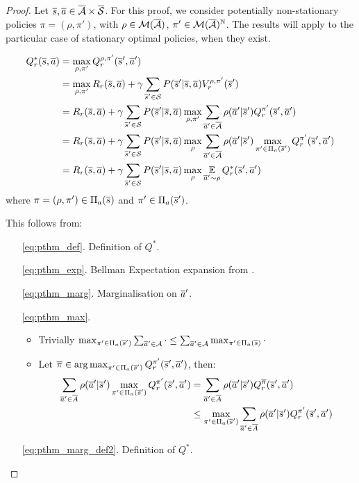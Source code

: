 \subsection{}

\begin{proof}
Let $\overline{s}, \overline{a} \in \overline{\mathcal{A}}\times\overline{\mathcal{S}}$. For this proof, we consider  potentially non-stationary policies $\pi=(\rho, \pi')$, with $\rho\in\mathcal{M}(\overline{\mathcal{A}})$, $\pi'\in\mathcal{M}(\overline{\mathcal{A}})^{\mathbb{N}}$. The results will apply to the particular case of stationary optimal policies, when they exist.

\begin{align}
    Q_r^*(\overline{s}, \overline{a}) &=  \max_{\rho, \pi'} Q_r^{\rho, \pi'}(\overline{s}', \overline{a}') \label{eq:pthm_def}\\
    &= \max_{\rho, \pi'} R_r(\overline{s}, \overline{a}) + \gamma \sum_{\overline{s}'\in\mathcal{S}} P(\overline{s}' | \overline{s}, \overline{a}) V_r^{\rho, \pi'}(\overline{s}') \label{eq:pthm_exp}\\
    &= R_r(\overline{s}, \overline{a}) + \gamma \sum_{\overline{s}'\in\mathcal{S}}  P(\overline{s}' | \overline{s}, \overline{a}) \max_{\rho, \pi'} \sum_{\overline{a}'\in\overline{\mathcal{A}}} \rho(\overline{a}' | \overline{s}')Q_r^{\pi'}(\overline{s}', \overline{a}') \label{eq:pthm_marg}\\
    &= R_r(\overline{s}, \overline{a}) + \gamma \sum_{\overline{s}'\in\mathcal{S}}  P(\overline{s}' | \overline{s}, \overline{a}) \max_\rho\sum_{\overline{a}'\in\overline{\mathcal{A}}}\rho(\overline{a}' | \overline{s}')\max_{\pi'\in\Pi_a(\overline{s}')}Q_r^{\pi'}(\overline{s}', \overline{a}') \label{eq:pthm_max}\\
    &= R_r(\overline{s}, \overline{a}) + \gamma \sum_{\overline{s}'\in\mathcal{S}}  P(\overline{s}' | \overline{s}, \overline{a}) \max_\rho\operatorname*{\mathbb{E}}\limits_{\overline{a}'\sim\rho}Q_r^*(\overline{s}', \overline{a}') \label{eq:pthm_marg_def2}
\end{align}
where $\pi = (\rho, \pi')\in\Pi_a(\overline{s})$ and $\pi'\in\Pi_a(\overline{s}')$.

This follows from:
\begin{enumerate}
\item[\eqref{eq:pthm_def}.] Definition of $Q^*$. 
\item[\eqref{eq:pthm_exp}.] Bellman Expectation expansion from .
\item[\eqref{eq:pthm_marg}.] Marginalisation on $\overline{a}'$.
\item[\eqref{eq:pthm_max}.] \begin{itemize}
    \item Trivially $\max_{\pi'\in\Pi_a(\overline{s}')} \sum_{\overline{a}'\in\mathcal{A}} \cdot \leq \sum_{\overline{a}'\in\mathcal{A}} \max_{ \pi'\in\Pi_a(\overline{s})} \cdot$
    \item Let $\overline{\pi}\in\operatorname*{arg\,max}_{\pi'\in\Pi_a(\overline{s}')} Q_r^{\pi'}(\overline{s}', \overline{a}')$, then:
    \begin{align*}
        \sum_{\overline{a}'\in\overline{A}}\rho(\overline{a}'|\overline{s}')\max_{\pi'\in\Pi_a(\overline{s}')}Q_r^{\pi'}(\overline{s}', \overline{a}') &= \sum_{\overline{a}'\in\overline{A}}\rho(\overline{a}'|\overline{s}')Q_r^{\overline{\pi}}(\overline{s}', \overline{a}') \\
        &\leq  \max_{\pi'\in\Pi_a(\overline{s}')} \sum_{\overline{a}'\in\overline{A}}\rho(\overline{a}'|\overline{s}')Q_r^{\pi'}(\overline{s}', \overline{a}')
    \end{align*}
\end{itemize}
\item[\eqref{eq:pthm_marg_def2}.] Definition of $Q^*$.
\end{enumerate}


\end{proof}

